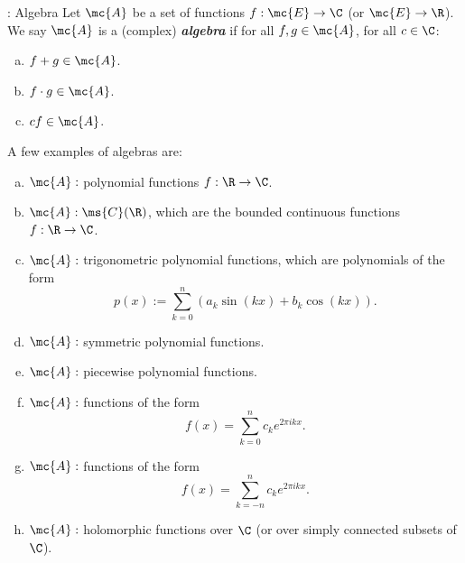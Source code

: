 \begin{ndef}{: Algebra}
    Let \(\mc{A}\) be a set of functions \(f:\mc{E}\to\C\) (or \(\mc{E}\to\R\)). We say \(\mc{A}\) is a (complex) \emph{\textbf{algebra}} if for all \(f,g\in\mc{A}\), for all \(c\in\C\):
    \begin{enumerate}[(a)]
        \item \(f+g\in\mc{A}\).
        
        \item \(f\cdot g\in\mc{A}\).
        
        \item \(cf\in\mc{A}\).
    \end{enumerate}
\end{ndef}
\begin{example}
    A few examples of algebras are:
    \begin{enumerate}[(a)]
        \item \(\mc{A}:\) polynomial functions \(f:\R\to\C\).
        
        \item \(\mc{A}:\ms{C}(\R)\), which are the bounded continuous functions \(f:\R\to\C\).
        
        \item \(\mc{A}:\) trigonometric polynomial functions, which are polynomials of the form
        \begin{equation*} 
            p(x):=\sum_{k=0}^{n}\left(a_k\sin{(kx)}+b_k\cos{(kx)}\right).
        \end{equation*}

        \item \(\mc{A}:\) symmetric polynomial functions.
        
        \item \(\mc{A}:\) piecewise polynomial functions.
    
        \item \(\mc{A}:\) functions of the form 
        \begin{equation*} 
            f(x)=\sum_{k=0}^{n} c_k e^{2\pi ikx}.
        \end{equation*}

        \item \(\mc{A}:\) functions of the form 
        \begin{equation*} 
            f(x)=\sum_{k=-n}^{n} c_k e^{2\pi ikx}.
        \end{equation*}

        \item \(\mc{A}:\) holomorphic functions over \(\C\) (or over simply connected subsets of \(\C\)).
    \end{enumerate}
\end{example}

